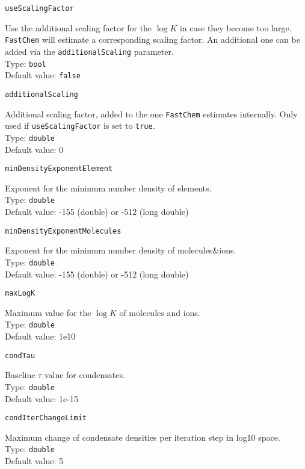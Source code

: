 \documentclass[numbers=noenddot]{aux/fcmanual}
\newcommand{\fc}{\texttt{FastChem}\xspace}
\begin{document}
\lstinline!useScalingFactor!
\begin{addmargin}[25pt]{0pt}
	Use the additional scaling factor for the $\log K$ in case they become too large. \fc will estimate a corresponding scaling factor. An additional one can be added via the \lstinline!additionalScaling! parameter.\\
	Type: \lstinline!bool!\\
	Default value: \lstinline!false!
\end{addmargin}

\lstinline!additionalScaling!
\begin{addmargin}[25pt]{0pt}
	Additional scaling factor, added to the one \fc estimates internally. Only used if \lstinline!useScalingFactor! is set to \lstinline!true!.\\
	Type: \lstinline!double!\\
	Default value: 0
\end{addmargin}

\lstinline!minDensityExponentElement!
\begin{addmargin}[25pt]{0pt}
	Exponent for the minimum number density of elements.\\
	Type: \lstinline!double!\\
	Default value: -155 (double) or -512 (long double)
\end{addmargin}

\lstinline!minDensityExponentMolecules!
\begin{addmargin}[25pt]{0pt}
	Exponent for the minimum number density of molecules\&ions.\\
	Type: \lstinline!double!\\
	Default value: -155 (double) or -512 (long double)
\end{addmargin}

\lstinline!maxLogK!
\begin{addmargin}[25pt]{0pt}
	Maximum value for the $\log K$ of molecules and ions.\\
	Type: \lstinline!double!\\
	Default value: 1e10
\end{addmargin}

\lstinline!condTau!
\begin{addmargin}[25pt]{0pt}
	Baseline $\tau$ value for condensates.\\
	Type: \lstinline!double!\\
	Default value: 1e-15
\end{addmargin}

\lstinline!condIterChangeLimit!
\begin{addmargin}[25pt]{0pt}
	Maximum change of condensate densities per iteration step in log10 space.\\
	Type: \lstinline!double!\\
	Default value: 5
\end{addmargin}
\end{document}
